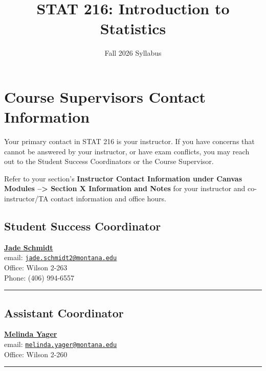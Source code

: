 \documentclass[
]{article}
\title{STAT 216: Introduction to Statistics}
\author{Fall 2026 Syllabus}
\date{}
\begin{document}
\maketitle

{
\setcounter{tocdepth}{3}
\tableofcontents
}
\section{Course Supervisors Contact
Information}\label{course-supervisors-contact-information}

Your primary contact in STAT 216 is your instructor. If you have
concerns that cannot be answered by your instructor, or have exam
conflicts, you may reach out to the Student Success Coordinators or the
Course Supervisor.

Refer to your section's \textbf{Instructor Contact Information under
Canvas Modules --\textgreater{} Section X Information and Notes} for
your instructor and co-instructor/TA contact information and office
hours.

\subsection{Student Success
Coordinator}\label{student-success-coordinator}

\href{http://www.math.montana.edu/directory/faculty/1524571/jade-schmidt}{\textbf{Jade
Schmidt}}\\
email:
\href{mailto:jade.schmidt2@montana.edu}{\nolinkurl{jade.schmidt2@montana.edu}}\\
Office: Wilson 2-263\\
Phone: (406) 994-6557

\begin{center}\rule{0.5\linewidth}{0.5pt}\end{center}

\subsection{Assistant Coordinator}\label{assistant-coordinator}

\href{http://www.math.montana.edu/directory/faculty/1582830/melinda-yager}{\textbf{Melinda
Yager}}\\
email:
\href{mailto:melinda.yager@montana.edu}{\nolinkurl{melinda.yager@montana.edu}}\\
Office: Wilson 2-260

\begin{center}\rule{0.5\linewidth}{0.5pt}\end{center}
\end{document}
